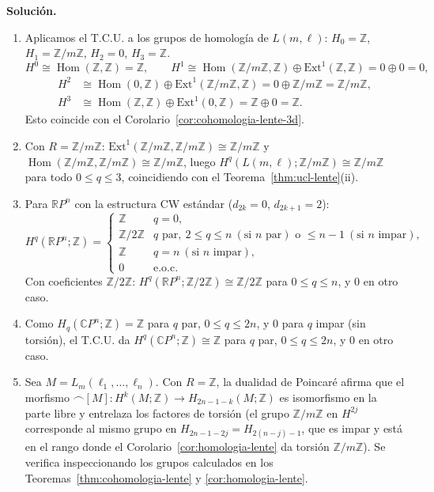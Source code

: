 \documentclass[11pt,a4paper]{article}
\theoremstyle{plain}
\theoremstyle{definition}
\theoremstyle{remark}
\newcommand{\RR}{\mathbb R}
\newcommand{\ZZ}{\mathbb Z}
\newcommand{\CC}{\mathbb C}
\DeclareMathOperator{\Hom}{Hom}
\begin{document}
\begin{enumerate}[label=\arabic*.,leftmargin=*]
\noindent\textbf{Solución.}
\begin{enumerate}[label=\alph*)]
\item Aplicamos el T.C.U. a los grupos de homología de $L(m,\ell)$:
$H_0=\ZZ$, $H_1=\ZZ/m\ZZ$, $H_2=0$, $H_3=\ZZ$.
\[
H^0\cong\Hom(\ZZ,\ZZ)=\ZZ, \qquad
H^1\cong\Hom(\ZZ/m\ZZ,\ZZ)\oplus\mathrm{Ext}^1(\ZZ,\ZZ)=0\oplus0=0,
\]
\[
\begin{aligned}
H^2&\cong\Hom(0,\ZZ)\oplus\mathrm{Ext}^1(\ZZ/m\ZZ,\ZZ)=0\oplus\ZZ/m\ZZ=\ZZ/m\ZZ,\\
H^3&\cong\Hom(\ZZ,\ZZ)\oplus\mathrm{Ext}^1(0,\ZZ)=\ZZ\oplus0=\ZZ.
\end{aligned}
\]
Esto coincide con el Corolario~\ref{cor:cohomologia-lente-3d}.
\item Con $R=\ZZ/m\ZZ$: $\mathrm{Ext}^1(\ZZ/m\ZZ,\ZZ/m\ZZ)\cong\ZZ/m\ZZ$ y
$\Hom(\ZZ/m\ZZ,\ZZ/m\ZZ)\cong\ZZ/m\ZZ$, luego
$H^q(L(m,\ell);\ZZ/m\ZZ)\cong\ZZ/m\ZZ$ para todo $0\le q\le3$, coincidiendo
con el Teorema~\ref{thm:ucl-lente}(ii).
\item Para $\RR P^n$ con la estructura CW estándar ($d_{2k}=0$,
$d_{2k+1}=2$):
\[
H^q(\RR P^n;\ZZ)=\begin{cases}
\ZZ & q=0,\\
\ZZ/2\ZZ & q\text{ par},\ 2\le q\le n\ (\text{si }n\text{ par})\text{ o }\le n-1\ (\text{si }n\text{ impar}),\\
\ZZ & q=n\ (\text{si }n\text{ impar}),\\
0 & \text{e.o.c.}
\end{cases}
\]
Con coeficientes $\ZZ/2\ZZ$: $H^q(\RR P^n;\ZZ/2\ZZ)\cong\ZZ/2\ZZ$ para
$0\le q\le n$, y $0$ en otro caso.
\item Como $H_q(\CC P^n;\ZZ)=\ZZ$ para $q$ par, $0\le q\le2n$, y $0$ para
$q$ impar (sin torsión), el T.C.U. da $H^q(\CC P^n;\ZZ)\cong\ZZ$ para $q$
par, $0\le q\le2n$, y $0$ en otro caso.
\item Sea $M=L_m(\ell_1,\dots,\ell_n)$. Con $R=\ZZ$, la dualidad de
Poincaré afirma que el morfismo $\frown[M]:H^k(M;\ZZ)\to H_{2n-1-k}(M;\ZZ)$
es isomorfismo en la parte libre y entrelaza los factores de torsión (el
grupo $\ZZ/m\ZZ$ en $H^{2j}$ corresponde al mismo grupo en
$H_{2n-1-2j}=H_{2(n-j)-1}$, que es impar y está en el rango donde el
Corolario~\ref{cor:homologia-lente} da torsión $\ZZ/m\ZZ$). Se verifica
inspeccionando los grupos calculados en los Teoremas~\ref{thm:cohomologia-lente}
y \ref{cor:homologia-lente}.
\end{enumerate}


\end{enumerate}
\end{document}
